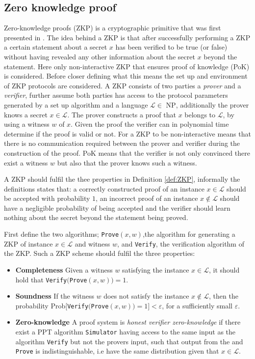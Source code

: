 \subsection*{Zero knowledge proof}
Zero-knowledge proofs (ZKP) is a cryptographic primitive that was first presented in \cite{OG_ZKP}. The idea behind a ZKP is that after successfully performing a ZKP a certain statement about a secret $x$ has been verified to be true (or false) without having revealed any other information about the secret $x$ beyond the statement. Here only non-interactive ZKP that ensures proof of knowledge (PoK) is considered.  Before closer defining what this means the set up and environment of ZKP protocols are considered. A ZKP consists of two parties a \textit{prover} and a \textit{verifier}, further assume both parties has access to the protocol parameters generated by a set up algorithm and a language $\mathcal{L}\in \text{ NP}$, additionally the prover knows a secret $x\in \mathcal{L}$. The prover constructs a proof that $x$ belongs to $\mathcal{L}$, by using a witness $w$ of $x$. Given the proof the verifier can in polynomial time determine if the proof is valid or not. 
For a ZKP to be non-interactive means that there is no communication required between the prover and verifier during the construction of the proof. PoK means that the verifier is not only convinced there exist a witness $w$ but also that the prover knows such a witness.

 A ZKP should fulfil the thee properties in Definition \ref{def:ZKP}, informally the definitions states that: a correctly constructed proof of an instance $x\in\mathcal{L}$ should be accepted with probability $1$, an incorrect proof of an instance $x\notin\mathcal{L}$ should have a negligible probability of being accepted and the verifier should learn nothing about the secret beyond the statement being proved.
 

\begin{Mydef}
\label{def:ZKP}
First define the two algorithms;  \texttt{Prove}$(x,w)$,the algorithm for generating a ZKP of instance $x\in\mathcal{L}$ and witness $w$, and  \texttt{Verify}, the verification algorithm of the ZKP. Such a ZKP scheme  should fulfil the three properties: 
\begin{itemize}
\item \textbf{Completeness} Given a witness $w$ satisfying the instance $x\in\mathcal{L}$, it should hold that \texttt{Verify}$($\texttt{Prove}$(x,w)) = 1$. 
\item \textbf{Soundness} If the witness $w$ does not satisfy the  instance $x\notin\mathcal{L}$, then the probability  Prob$[$\texttt{Verify}$($\texttt{Prove}$(x,w)) = 1] < \varepsilon$, for a sufficiently small $\varepsilon$. 
\item  \textbf{Zero-knowledge} A proof system is \textit{honest verifier zero-knowledge} if there exist a PPT algorithm \texttt{Simulator} having access to the same input as the algorithm \texttt{Verify} but not the provers input, such that output from the  and \texttt{Prove} is indistinguishable, i.e have the same distribution given that $x\in\mathcal{L}$.  
\end{itemize}
\end{Mydef}
 
